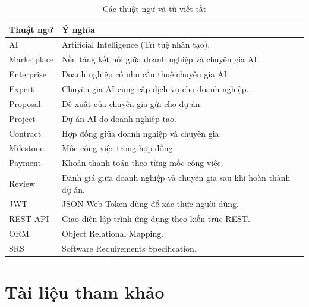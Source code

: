 \begin{table}[H]
\centering
\caption{Các thuật ngữ và từ viết tắt}
\begin{tabular}{|p{4cm}|p{10cm}|}
\hline
\textbf{Thuật ngữ} & \textbf{Ý nghĩa} \\ \hline

AI &
Artificial Intelligence (Trí tuệ nhân tạo). \\ \hline

Marketplace &
Nền tảng kết nối giữa doanh nghiệp và chuyên gia AI. \\ \hline

Enterprise &
Doanh nghiệp có nhu cầu thuê chuyên gia AI. \\ \hline

Expert &
Chuyên gia AI cung cấp dịch vụ cho doanh nghiệp. \\ \hline

Proposal &
Đề xuất của chuyên gia gửi cho dự án. \\ \hline

Project &
Dự án AI do doanh nghiệp tạo. \\ \hline

Contract &
Hợp đồng giữa doanh nghiệp và chuyên gia. \\ \hline

Milestone &
Mốc công việc trong hợp đồng. \\ \hline

Payment &
Khoản thanh toán theo từng mốc công việc. \\ \hline

Review &
Đánh giá giữa doanh nghiệp và chuyên gia sau khi hoàn thành dự án. \\ \hline

JWT &
JSON Web Token dùng để xác thực người dùng. \\ \hline

REST API &
Giao diện lập trình ứng dụng theo kiến trúc REST. \\ \hline

ORM &
Object Relational Mapping. \\ \hline

SRS &
Software Requirements Specification. \\ \hline

\end{tabular}
\end{table}


\section{Tài liệu tham khảo}

